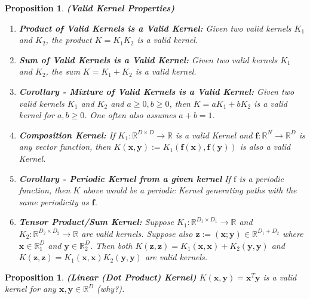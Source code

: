 \documentclass[11pt]{article}
\theoremstyle{plain} %
\newtheorem{proposition}[theorem]{Proposition}
\theoremstyle{remark}
\begin{document}
\begin{proposition}\textbf{(Valid Kernel Properties)}\hfill
  \begin{enumerate}[label=(\alph*)]
    \item \textbf{Product of Valid Kernels is a Valid Kernel:}
          Given two valid kernels $K_{1}$ and $K_{2}$, the product $K=K_{1} K_{2}$ is a
          valid kernel.
    \item \textbf{Sum of Valid Kernels is a Valid Kernel:}
          Given two valid kernels $K_{1}$ and $K_{2}$, the sum $K=K_{1}+K_{2}$ is a valid kernel.
    \item \textbf{Corollary - Mixture of Valid Kernels is a Valid Kernel:}
          Given two valid kernels $K_{1}$ and $K_{2}$ and $a \geq 0, b \geq 0$, then $K=aK_{1}+b K_{2}$ is a valid kernel for $a, b \geq 0$. One often also assumes
          $a+b=1$.
    \item \textbf{Composition Kernel:}
          If $K_{1}: \mathbb{R}^{D \times D} \rightarrow \mathbb{R}$ is a valid Kernel and
          $\mathbf{f}: \mathbb{R}^{N} \rightarrow \mathbb{R}^{D}$ is any vector function,
          then $K(\mathbf{x}, \mathbf{y}):=K_{1}(\mathbf{f}(\mathbf{x}),
            \mathbf{f}(\mathbf{y}))$ is also a valid Kernel.
    \item \textbf{Corollary - Periodic Kernel from a given kernel}
          If $\mathrm{f}$ is a periodic function, then $K$ above would be a periodic
          Kernel generating paths with the same periodicity as $\mathbf{f}$.
    \item \textbf{Tensor Product/Sum Kernel:}
          Suppose $K_{1}: \mathbb{R}^{D_{1} \times D_{1}} \rightarrow \mathbb{R}$ and
          $K_{2}: \mathbb{R}^{D_{2} \times D_{2}} \rightarrow \mathbb{R}$ are valid
          kernels. Suppose also $\mathbf{z}:=(\mathbf{x} ; \mathbf{y}) \in
            \mathbb{R}^{D_{1}+D_{2}}$ where $\mathbf{x} \in \mathbb{R}_{1}^{D}$ and
          $\mathbf{y} \in \mathbb{R}_{2}^{D}$. Then both $K(\mathbf{z},
            \mathbf{z})=K_{1}(\mathbf{x}, \mathbf{x})+K_{2}(\mathbf{y}, \mathbf{y})$ and
          $K(\mathbf{z}, \mathbf{z})=K_{1}(\mathbf{x}, \mathbf{x}) K_{2}(\mathbf{y},
            \mathbf{y})$ are valid kernels.
  \end{enumerate}
\end{proposition}

\begin{proposition}\textbf{(Linear (Dot Product) Kernel)}
  $K(\mathbf{x}, \mathbf{y})=\mathbf{x}^{T} \mathbf{y}$ is a valid kernel for any
  $\mathbf{x}, \mathbf{y} \in \mathbb{R}^{D}$ (why?).
\end{proposition}
\end{document}
